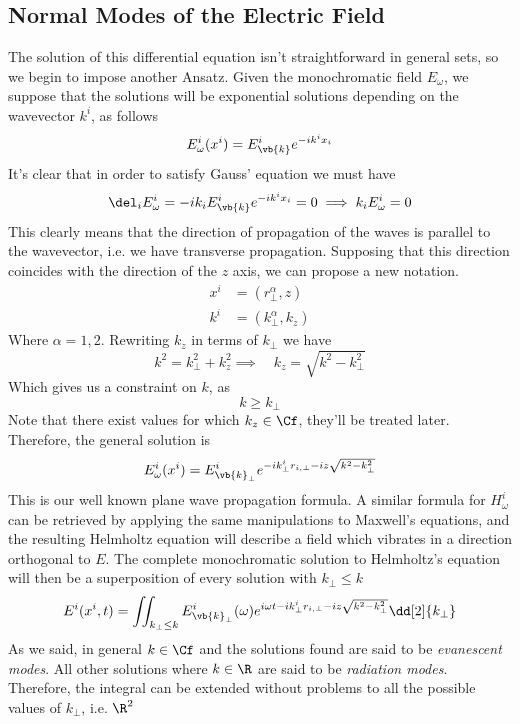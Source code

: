 \documentclass[../electromagnetism.tex]{subfiles}
\begin{document}
\subsection{Normal Modes of the Electric Field}
The solution of this differential equation isn't straightforward in general sets, so we begin to impose another Ansatz. Given the monochromatic field $E_\omega$, we suppose that the solutions will be exponential solutions depending on the wavevector $k^i$, as follows
\begin{equation*}
	E_\omega^i(x^i)=E_{\vb{k}}^ie^{-ik^ix_i}
\end{equation*}
It's clear that in order to satisfy Gauss' equation we must have
\begin{equation*}
	\del_iE^i_\omega=-ik_iE^i_{\vb{k}}e^{-ik^ix_i}=0\implies k_iE^i_\omega=0
\end{equation*}
This clearly means that the direction of propagation of the waves is parallel to the wavevector, i.e. we have transverse propagation. Supposing that this direction coincides with the direction of the $z$ axis, we can propose a new notation.
\begin{equation*}
	\begin{aligned}
		x^i&=(r_\perp^\alpha,z)\\
		k^i&=(k_\perp^\alpha,k_z)
	\end{aligned}
\end{equation*}
Where $\alpha=1,2$. Rewriting $k_z$ in terms of $k_\perp$ we have
\begin{equation*}
	k^2=k_\perp^2+k_z^2\implies\quad k_z=\sqrt{k^2-k_\perp^2}
\end{equation*}
Which gives us a constraint on $k$, as
\begin{equation*}
	k\ge k_\perp
\end{equation*}
Note that there exist values for which $k_z\in\Cf$, they'll be treated later. Therefore, the general solution is
\begin{equation}
	E^i_\omega(x^i)=E_{\vb{k}_\perp}^ie^{-ik^i_\perp r_{i,\perp}-iz\sqrt{k^2-k^2_\perp}}
	\label{eq:generalparaxialsol}
\end{equation}
This is our well known plane wave propagation formula. A similar formula for $H^i_\omega$ can be retrieved by applying the same manipulations to Maxwell's equations, and the resulting Helmholtz equation will describe a field which vibrates in a direction orthogonal to $E$.
The complete monochromatic solution to Helmholtz's equation will then be a superposition of every solution with $k_\perp\le k$
\begin{equation}
	E^i(x^i,t)=\iint_{k_\perp\le k}E^i_{\vb{k}_\perp}(\omega)e^{i\omega t-ik^i_{\perp}r_{i,\perp}-iz\sqrt{k^2-k^2_\perp}}\dd[2]{k_\perp}
	\label{eq:completesol}
\end{equation}
As we said, in general $k\in\Cf$ and the solutions found are said to be \textit{evanescent modes}. All other solutions where $k\in\R$ are said to be \textit{radiation modes}. Therefore, the integral can be extended without problems to all the possible values of $k_\perp$, i.e. $\R^2$
\end{document}

